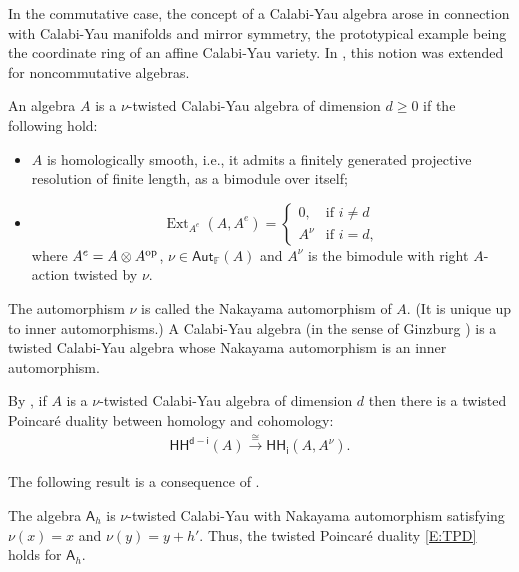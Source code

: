 \documentclass{commat}
\newcommand{\FF}{\mathbb{F}}
\newcommand{\A}{\mathsf{A}}
\newcommand\aut[1][\FF]{ \mathsf{Aut}_{#1}}
\begin{document}
In the commutative case, the concept of a Calabi-Yau algebra arose in connection with Calabi-Yau manifolds and mirror symmetry, the prototypical example being the coordinate ring of an affine Calabi-Yau variety. In \cite{vG07arXiv}, this notion was extended for noncommutative algebras.

\begin{definition}
	An algebra $A$ is a $\nu$-twisted Calabi-Yau algebra of dimension $d\geq 0$ if the following hold:
	\begin{itemize}
		\item $A$ is homologically smooth, i.e., it admits a finitely generated projective resolution of finite length, as a bimodule over itself;
		\item 
		$$
		\operatorname{Ext}_{A^e}(A,A^e)=
		\begin{cases}
			0,& \mbox{if $i\neq d$}\\
			A^\nu&\mbox{if $i = d$},
		\end{cases}
		$$
		where $A^e=A\otimes A^{\rm op}$, $\nu\in\aut(A)$ and $A^\nu$ is the bimodule with right $A$-action twisted by $\nu$.
	\end{itemize} 
	The automorphism $\nu$ is called the Nakayama automorphism of $A$. (It is unique up to inner automorphisms.) A Calabi-Yau algebra (in the sense of Ginzburg \cite{vG07arXiv}) is a twisted Calabi-Yau algebra whose Nakayama automorphism is an inner automorphism. 
\end{definition}

By \cite{vdB98}, if  $A$ is  a $\nu$-twisted Calabi-Yau algebra of dimension $d$ then there is a twisted Poincar\'e duality between homology and cohomology:
\begin{align}\label{E:TPD}
	\mathsf{HH^{d-i}}(A)\stackrel{\cong}{\longrightarrow} \mathsf{HH_i}(A,  A^\nu).
\end{align}

The following result is a consequence of \cite[Thm.\ 3.3, Rmk.\ 3.4, (2.10)]{LLW14}.

\begin{theorem}
	The algebra $\A_h$ is $\nu$-twisted Calabi-Yau with Nakayama automorphism satisfying $\nu(x)= x$ and $\nu(y)=y+h'$. Thus, the twisted Poincaré duality \eqref{E:TPD} holds for $\A_h$.
\end{theorem}
\end{document}
